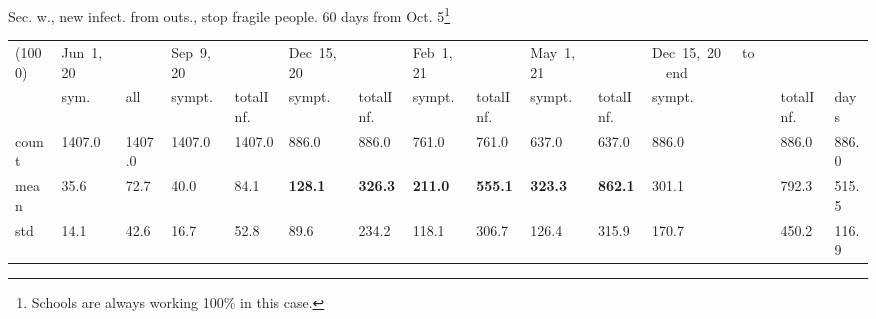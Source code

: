 \documentclass[8pt]{beamer}
\begin{document}
\begin{frame}{Sec. w., new infect. from outs., stop fragile people. 60  days from Oct. 5\footnote{Schools are always working 100\% in this case.}}
\begin{table}[H]
\center
\tiny
\begin{tabular}{p{0.3cm}p{0.3cm}p{0.3cm}p{0.3cm}p{0.3cm}p{0.3cm}p{0.3cm}p{0.3cm}p{0.3cm}p{0.3cm}p{0.3cm}p{0.3cm}p{0.3cm}p{0.4cm}}
\toprule
(1000) &  Jun~1,~20 & &  Sep~9,~20 & & Dec~15,~20 & & Feb~1,~21 & & May~1,~21 & & Dec~15,~20~~~to~~~end   \\
{} &  sym. &  all &  sympt. &  totalInf. &  sympt. &  totalInf. &  sympt. &  totalInf. &  sympt. &  totalInf. &  sympt. &  totalInf.  & days\\
\midrule
count &   1407.0 &                     1407.0 &   1407.0 &                     1407.0 &    886.0 &                      886.0 &    761.0 &                      761.0 &    637.0 &                      637.0 &              886.0 &                   886.0 &  886.0 \\
mean  &     35.6 &                       72.7 &     40.0 &                       84.1 &    \textbf{{\color{cyan}128.1}} &                      \textbf{{\color{cyan}326.3}} &    \textbf{211.0} &                      \textbf{555.1} &    \textbf{323.3} &                      \textbf{862.1} &               301.1 &                   792.3 &  515.5 \\
std   &     14.1 &                       42.6 &     16.7 &                       52.8 &     89.6 &                      234.2 &    118.1 &                      306.7 &    126.4 &                      315.9 &               170.7 &                   450.2 &  116.9 \\
\bottomrule
\end{tabular}

\label{selForceWave2NoFragTab}
\end{table}


\end{frame}
\end{document}
